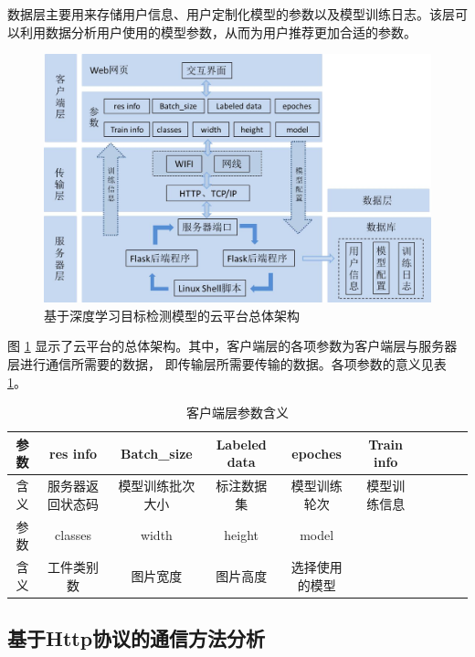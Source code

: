 数据层主要用来存储用户信息、用户定制化模型的参数以及模型训练日志。该层可以利用数据分析用户使用的模型参数，从而为用户推荐更加合适的参数。

\begin{figure}[htbp]
    \centering
    \includegraphics[width=\textwidth]{pic/chap4/cloudplatform_construct.jpg}
    \caption{基于深度学习目标检测模型的云平台总体架构}
    \label{fig:cloudplatform_construct}
\end{figure}
图 \ref{fig:cloudplatform_construct} 显示了云平台的总体架构。其中，客户端层的各项参数为客户端层与服务器层进行通信所需要的数据，
即传输层所需要传输的数据。各项参数的意义见表 \ref{table:Web:info}。

{
    \begin{table}[htb]
        \caption{客户端层参数含义}
        \label{table:Web:info}
        \centering
        \begin{tabular}[t]{c|c|c|c|c|cc|c|c|c}
            \hline
            参数 & res info & Batch\_size & Labeled data & epoches & Train info \\
            \hline
            含义 & 服务器返回状态码 & 模型训练批次大小 & 标注数据集 & 模型训练轮次 & 模型训练信息\\
            \hline
            参数 & classes & width & height & model \\
            \hline
            含义 & 工件类别数 & 图片宽度 & 图片高度 & 选择使用的模型 \\
            \hline
        \end{tabular}
    \end{table}
}

\subsection{基于Http协议的通信方法分析}

